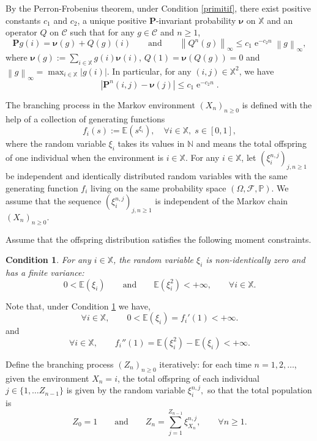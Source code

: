 \documentclass[12pt]{amsart}
\newtheorem{condition}{Condition}
\theoremstyle{definition}
\numberwithin{equation}{section}
\newcommand*{\abs}[1]{\left\lvert#1\right\rvert}
\newcommand*{\norm}[1]{\left\lVert#1\right\rVert}
\def\bb#1{\mathbb{#1}}
\def\bs#1{\boldsymbol{#1}}
\def\bf#1{\mathbf{#1}}
\def\scr#1{\mathscr{#1}}
\def\geq{\geqslant}
\def\leq{\leqslant}
\DeclareMathOperator{\e}{e}
\begin{document}
By the Perron-Frobenius theorem, under Condition \ref{primitif}, there exist
positive constants $c_1$ and $c_2$, a unique positive $\bf P$-invariant probability 
$\bs \nu$ on $\bb X$ and an operator $Q$ on $\scr C$ such that for any $g \in \scr C$ and $n \geq 1$,
\[
\bf Pg(i) = \bs \nu(g) + Q(g)(i) \qquad \text{and} \qquad \norm{Q^n(g)}_{\infty} \leq c_1\e^{-c_2n} \norm{g}_{\infty},
\]
where 
$\bs \nu(g) := \sum_{i \in \bb X} g(i) \bs \nu(i)$,
$Q \left(1 \right) = \bs \nu \left(Q(g) \right) = 0$
and 
$\norm{g}_{\infty}= \max_{i \in \bb X} \abs{g(i)}$.
In particular, for any $(i,j) \in \bb X^2$, we have
\begin{equation}
	\label{soeur}
	\abs{\bf P^n(i,j) - \bs \nu(j)} \leq c_1\e^{-c_2 n}.
\end{equation}
 
The branching process in the Markov environment $\left( X_n \right)_{n\geq 0}$
is defined with the help of a collection of generating functions
\begin{equation}
	\label{jazz}
	f_i(s) := \bb E \left( s^{\xi_i} \right), \quad \forall i \in \bb X, \; s \in [0,1],
\end{equation}
where the random variable $\xi_i$ takes its values in $\bb N$ and means the total offspring of one individual when the environment is $i\in \bb X.$ For any $i \in \bb X$, let $( \xi_i^{n,j} )_{j,n \geq 1}$ be independent and identically distributed random variables with the same generating function $f_i$ living on the same probability space $\left( \Omega, \scr F, \bb P \right)$.
We assume that the sequence $( \xi_i^{n,j} )_{j,n \geq 1}$ is independent 
of the Markov chain $\left( X_n \right)_{n\geq 0}.$ 

Assume that the offspring distribution satisfies the following moment constraints.

\begin{condition}
\label{eglise}
For any $i \in \bb X$, the random variable $\xi_i$ is non-identically zero and has a finite variance:
\[
0 < \bb E \left( \xi_i \right) \qquad \text{and} \qquad \bb E ( \xi_i^2 ) < +\infty,  \qquad  \forall i \in \bb X.
\]
\end{condition}
Note that, under Condition \ref{eglise} we have,
\[
\forall i \in \bb X, \qquad 0< \bb E \left( \xi_i \right) = f_i'(1) < +\infty.
\]
and
\[
\forall i \in \bb X, \qquad f_i''(1) =\bb E ( \xi_i^2 )-\bb E \left( \xi_i \right)  < +\infty.
\]

Define the branching process $\left( Z_n \right)_{n\geq 0}$ iteratively: 
for each time $n=1,2,\dots$, given the environment $X_n = i$, the total offspring of each individual $j\in \{1, \dots Z_{n-1} \}$ is given by the random variable $\xi_{i}^{n,j},$ so that the total population is
\begin{equation}
\label{roseau}
Z_0 = 1 \qquad \text{and} \qquad Z_n = \sum_{j=1}^{Z_{n-1}} \xi_{X_n}^{n,j}, \qquad \forall n \geq 1.
\end{equation}
\end{document}

